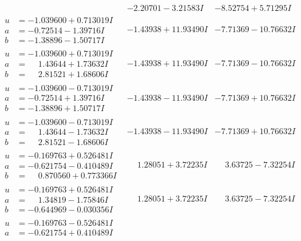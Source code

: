 \documentclass[1p]{elsarticle_modified}
\theoremstyle{definition}
\begin{document}
$$\begin{array}{c|c|c}
 & -2.20701 - 3.21583 I & -8.52754 + 5.71295 I \\ \hline\begin{aligned}
u &= -1.039600 + 0.713019 I \\
a &= -0.72514 - 1.39716 I \\
b &= -1.38896 - 1.50717 I\end{aligned}
 & -1.43938 + 11.93490 I & -7.71369 - 10.76632 I \\ \hline\begin{aligned}
u &= -1.039600 + 0.713019 I \\
a &= \phantom{-}1.43644 + 1.73632 I \\
b &= \phantom{-}2.81521 + 1.68606 I\end{aligned}
 & -1.43938 + 11.93490 I & -7.71369 - 10.76632 I \\ \hline\begin{aligned}
u &= -1.039600 - 0.713019 I \\
a &= -0.72514 + 1.39716 I \\
b &= -1.38896 + 1.50717 I\end{aligned}
 & -1.43938 - 11.93490 I & -7.71369 + 10.76632 I \\ \hline\begin{aligned}
u &= -1.039600 - 0.713019 I \\
a &= \phantom{-}1.43644 - 1.73632 I \\
b &= \phantom{-}2.81521 - 1.68606 I\end{aligned}
 & -1.43938 - 11.93490 I & -7.71369 + 10.76632 I \\ \hline\begin{aligned}
u &= -0.169763 + 0.526481 I \\
a &= -0.621754 - 0.410489 I \\
b &= \phantom{-}0.870560 + 0.773366 I\end{aligned}
 & \phantom{-}1.28051 + 3.72235 I & \phantom{-}3.63725 - 7.32254 I \\ \hline\begin{aligned}
u &= -0.169763 + 0.526481 I \\
a &= \phantom{-}1.34819 - 1.75846 I \\
b &= -0.644969 - 0.030356 I\end{aligned}
 & \phantom{-}1.28051 + 3.72235 I & \phantom{-}3.63725 - 7.32254 I \\ \hline\begin{aligned}
u &= -0.169763 - 0.526481 I \\
a &= -0.621754 + 0.410489 I \\

\end{aligned}
\end{array}$$
\end{document}
